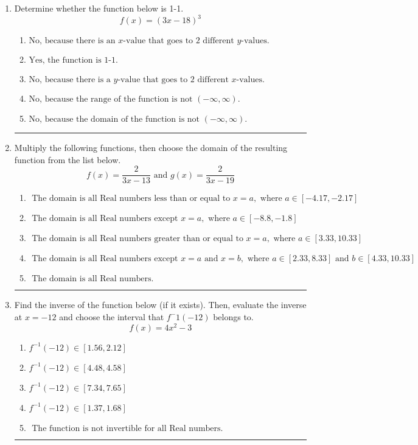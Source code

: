 \documentclass[14pt]{extbook}
\newcommand{\litem}[1]{\item#1\hspace*{-1cm}\rule{\textwidth}{0.4pt}}
\begin{document}
\begin{enumerate}
{\begin{enumerate}[label=\Alph*.]
\end{enumerate} }
\litem{
Determine whether the function below is 1-1.\[ f(x) = (3 x - 18)^3 \]\begin{enumerate}[label=\Alph*.]
\item \( \text{No, because there is an $x$-value that goes to 2 different $y$-values.} \)
\item \( \text{Yes, the function is 1-1.} \)
\item \( \text{No, because there is a $y$-value that goes to 2 different $x$-values.} \)
\item \( \text{No, because the range of the function is not $(-\infty, \infty)$.} \)
\item \( \text{No, because the domain of the function is not $(-\infty, \infty)$.} \)

\end{enumerate} }
\litem{
Multiply the following functions, then choose the domain of the resulting function from the list below.\[ f(x) = \frac{2}{3x-13} \text{ and } g(x) = \frac{2}{3x-19} \]\begin{enumerate}[label=\Alph*.]
\item \( \text{ The domain is all Real numbers less than or equal to } x = a, \text{ where } a \in [-4.17, -2.17] \)
\item \( \text{ The domain is all Real numbers except } x = a, \text{ where } a \in [-8.8, -1.8] \)
\item \( \text{ The domain is all Real numbers greater than or equal to } x = a, \text{ where } a \in [3.33, 10.33] \)
\item \( \text{ The domain is all Real numbers except } x = a \text{ and } x = b, \text{ where } a \in [2.33, 8.33] \text{ and } b \in [4.33, 10.33] \)
\item \( \text{ The domain is all Real numbers. } \)

\end{enumerate} }
\litem{
Find the inverse of the function below (if it exists). Then, evaluate the inverse at $x = -12$ and choose the interval that $f^-1(-12)$ belongs to.\[ f(x) = 4 x^2 - 3 \]\begin{enumerate}[label=\Alph*.]
\item \( f^{-1}(-12) \in [1.56, 2.12] \)
\item \( f^{-1}(-12) \in [4.48, 4.58] \)
\item \( f^{-1}(-12) \in [7.34, 7.65] \)
\item \( f^{-1}(-12) \in [1.37, 1.68] \)
\item \( \text{ The function is not invertible for all Real numbers. } \)

\end{enumerate} }
\end{enumerate}
\end{document}
